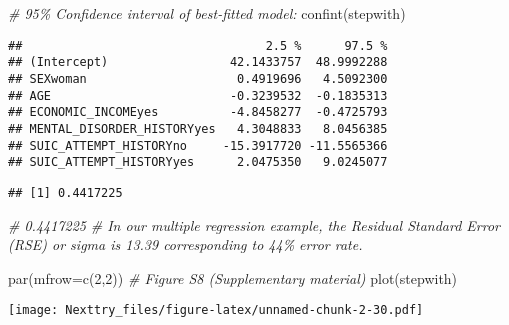 \documentclass[
]{book}
\newenvironment{Shaded}{\begin{snugshade}}{\end{snugshade}}
\newcommand{\AttributeTok}[1]{\textcolor[rgb]{0.77,0.63,0.00}{#1}}
\newcommand{\CommentTok}[1]{\textcolor[rgb]{0.56,0.35,0.01}{\textit{#1}}}
\newcommand{\DecValTok}[1]{\textcolor[rgb]{0.00,0.00,0.81}{#1}}
\newcommand{\FunctionTok}[1]{\textcolor[rgb]{0.00,0.00,0.00}{#1}}
\newcommand{\NormalTok}[1]{#1}
\newcommand{\SpecialCharTok}[1]{\textcolor[rgb]{0.00,0.00,0.00}{#1}}
\begin{document}
\begin{Shaded}
\begin{Highlighting}[]
\CommentTok{\# 95\% Confidence interval of best{-}fitted model:}
\FunctionTok{confint}\NormalTok{(stepwith)}
\end{Highlighting}
\end{Shaded}

\begin{verbatim}
##                                  2.5 %      97.5 %
## (Intercept)                 42.1433757  48.9992288
## SEXwoman                     0.4919696   4.5092300
## AGE                         -0.3239532  -0.1835313
## ECONOMIC_INCOMEyes          -4.8458277  -0.4725793
## MENTAL_DISORDER_HISTORYyes   4.3048833   8.0456385
## SUIC_ATTEMPT_HISTORYno     -15.3917720 -11.5565366
## SUIC_ATTEMPT_HISTORYyes      2.0475350   9.0245077
\end{verbatim}

\begin{Shaded}
\end{Shaded}

\begin{verbatim}
## [1] 0.4417225
\end{verbatim}

\begin{Shaded}
\begin{Highlighting}[]
\CommentTok{\# 0.4417225}
\CommentTok{\# In our multiple regression example, the Residual Standard Error (RSE) or sigma is 13.39 corresponding to 44\% error rate.}

\FunctionTok{par}\NormalTok{(}\AttributeTok{mfrow=}\FunctionTok{c}\NormalTok{(}\DecValTok{2}\NormalTok{,}\DecValTok{2}\NormalTok{))}
\CommentTok{\# Figure S8 (Supplementary material)}
\FunctionTok{plot}\NormalTok{(stepwith)}
\end{Highlighting}
\end{Shaded}

\texttt{[image: Nexttry\_files/figure-latex/unnamed-chunk-2-30.pdf]}
\end{document}
